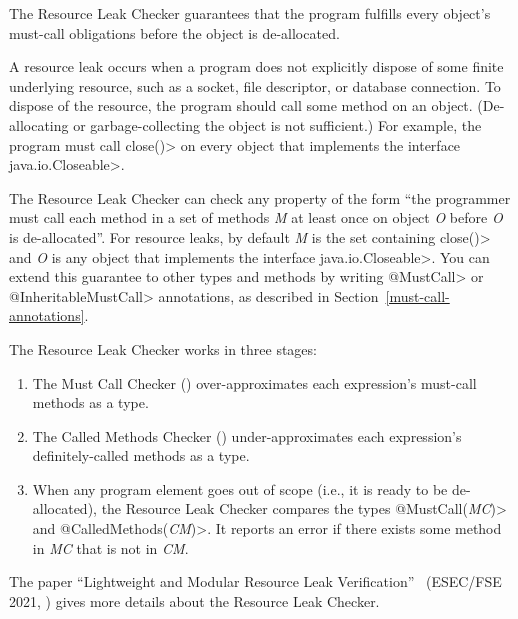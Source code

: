\htmlhr
{}

The Resource Leak Checker guarantees that the program fulfills every object's
must-call obligations before the object is de-allocated.

A resource leak occurs when a program does not explicitly dispose of some finite
underlying resource, such as a socket, file descriptor, or database connection.  To dispose
of the resource, the program should call some method on an object.
(De-allocating or garbage-collecting the object is not sufficient.)  For
example, the program must call \<close()> on every object that implements the
interface \<java.io.Closeable>.

The Resource Leak Checker can check any property of the form ``the programmer
must call each method in a set of methods \emph{M} at least once
on object \emph{O} before \emph{O} is de-allocated''.  For resource leaks,
by default \emph{M} is the set containing
\<close()> and \emph{O} is any object that implements the interface
\<java.io.Closeable>.  You can extend this guarantee to other types and methods
by writing \<@MustCall> or \<@InheritableMustCall> annotations, as described in
Section~\ref{must-call-annotations}.

The Resource Leak Checker works in three stages:
\begin{enumerate}
\item The Must Call Checker ()
  over-approximates each expression's must-call methods as a
   type.
\item The Called Methods Checker ()
  under-approximates each expression's definitely-called methods as a
   type.
\item When any program element goes out of scope (i.e., it is ready to be
  de-allocated), the Resource Leak Checker compares the types
  \<@MustCall(\emph{MC})> and \<@CalledMethods(\emph{CM})>.  It reports an error
  if there exists some method in \emph{MC} that is not in \emph{CM}.
\end{enumerate}

The paper
``Lightweight and Modular Resource Leak Verification''~\cite{KelloggSSE2021} (ESEC/FSE 2021,
)
gives more details about the Resource Leak Checker.


